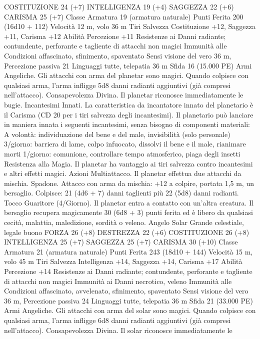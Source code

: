 \begin{multicols}{2}
COSTITUZIONE 24 (+7)
INTELLIGENZA 19 (+4)
SAGGEZZA 22 (+6)
CARISMA 25 (+7)
Classe Armatura 19 (armatura naturale)
Punti Ferita 200 (16d10 + 112)
Velocità 12 m, volo 36 m
Tiri Salvezza Costituzione +12, Saggezza +11, Carisma +12
Abilità Percezione +11
Resistenze ai Danni radiante; contundente, perforante e tagliente
di attacchi non magici
Immunità alle Condizioni affascinato, sfinimento, spaventato
Sensi visione del vero 36 m, Percezione passiva 21
Linguaggi tutte, telepatia 36 m
Sfida 16 (15.000 PE)
Armi Angeliche. Gli attacchi con arma del planetar sono magici.
Quando colpisce con qualsiasi arma, l’arma infligge 5d8 danni
radianti aggiuntivi (già compresi nell’attacco).
Consapevolezza Divina. Il planetar riconosce immediatamente le
bugie.
Incantesimi Innati. La caratteristica da incantatore innato del
planetario è il Carisma (CD 20 per i tiri salvezza degli
incantesimi). Il planetario può lanciare in maniera innata i
seguenti incantesimi, senza bisogno di componenti materiali:
A volontà: individuazione del bene e del male, invisibilità (solo
personale)
3/giorno: barriera di lame, colpo infuocato, dissolvi il bene e il
male, rianimare morti
1/giorno: comunione, controllare tempo atmosferico, piaga degli
insetti
Resistenza alla Magia. Il planetar ha vantaggio ai tiri salvezza
contro incantesimi e altri effetti magici.
Azioni
Multiattacco. Il planetar effettua due attacchi da mischia.
Spadone. Attacco con arma da mischia: +12 a colpire, portata
1,5 m, un bersaglio.
Colpisce: 21 (4d6 + 7) danni taglienti più 22 (5d8) danni radianti.
Tocco Guaritore (4/Giorno). Il planetar entra a contatto con
un’altra creatura. Il bersaglio recupera magicamente 30 (6d8 + 3)
punti ferita ed è libero da qualsiasi cecità, malattia, maledizione,
sordità o veleno.
Angelo Solar
Grande celestiale, legale buono
FORZA 26 (+8)
DESTREZZA 22 (+6)
COSTITUZIONE 26 (+8)
INTELLIGENZA 25 (+7)
SAGGEZZA 25 (+7)
CARISMA 30 (+10)
Classe Armatura 21 (armatura naturale)
Punti Ferita 243 (18d10 + 144)
Velocità 15 m, volo 45 m
Tiri Salvezza Intelligenza +14, Saggezza +14, Carisma +17
Abilità Percezione +14
Resistenze ai Danni radiante; contundente, perforante e tagliente
di attacchi non magici
Immunità ai Danni necrotico, veleno
Immunità alle Condizioni affascinato, avvelenato, sfinimento,
spaventato
Sensi visione del vero 36 m, Percezione passiva 24
Linguaggi tutte, telepatia 36 m
Sfida 21 (33.000 PE)
Armi Angeliche. Gli attacchi con arma del solar sono magici.
Quando colpisce con qualsiasi arma, l’arma infligge 6d8 danni
radianti aggiuntivi (già compresi nell’attacco).
Consapevolezza Divina. Il solar riconosce immediatamente le

\end{multicols}
